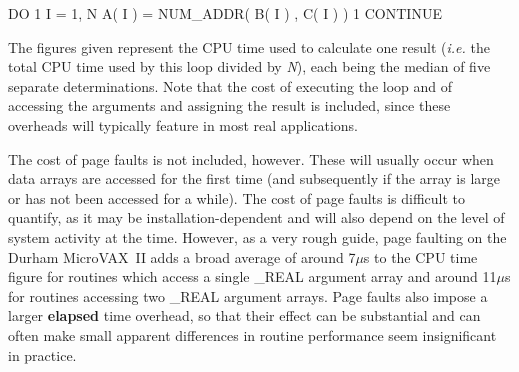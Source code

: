 \documentclass[11pt,nolof]{starlink}
\providecommand{\name}[1]{#1}
\providecommand{\fortvar}[1]{\emph{#1}}
\begin{document}
\begin{terminalv}
  DO 1 I = 1, N
    A( I ) = NUM_ADDR( B( I ) , C( I ) )
1 CONTINUE
\end{terminalv}

The figures given represent the \name{CPU} time used to calculate one result
(\emph{i.e.} the total \name{CPU} time used by this loop divided by
\fortvar{N}), each being the median of five separate determinations.
Note that the cost of executing the loop and of accessing the arguments and
assigning the result is included, since these overheads will typically
feature in most real applications.

The cost of page faults is not included, however.
These will usually occur when data arrays are accessed for the first time
(and subsequently if the array is large or has not been accessed for a while).
The cost of page faults is difficult to quantify, as it may be
installation-dependent and will also depend on the level of system activity
at the time.
However, as a very rough guide, page faulting on the Durham \name{MicroVAX}~II
adds a broad average of around 7$\mu$s to the \name{CPU} time figure for
routines which access a single \name{\_REAL} argument array and around 11$\mu$s
for routines accessing two \name{\_REAL} argument arrays.
Page faults also impose a larger \textbf{elapsed} time overhead, so that their
effect can be substantial and can often make small apparent differences in
routine performance seem insignificant in practice.

\newpage
\end{document}
